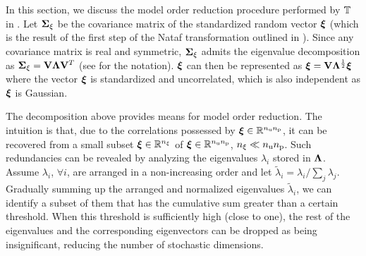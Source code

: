 In this section, we discuss the model order reduction procedure performed by $\transformation$ in .
Let $\bm{\Sigma}_\xi$ be the covariance matrix of the standardized random vector $\bm{\xi}$ (which is the result of the first step of the Nataf transformation outlined in ).
Since any covariance matrix is real and symmetric, $\bm{\Sigma}_\xi$ admits the eigenvalue decomposition as $\bm{\Sigma}_\xi = \mathbf{V} \mathbf{\Lambda} \mathbf{V}^T$ (see  for the notation).
$\bm{\xi}$ can then be represented as $\bm{\xi} = \mathbf{V} \mathbf{\Lambda}^\frac{1}{2} \bm{\xi}$ where the vector $\bm{\xi}$ is standardized and uncorrelated, which is also independent as $\bm{\xi}$ is Gaussian.

The decomposition above provides means for model order reduction.
The intuition is that, due to the correlations possessed by $\bm{\xi} \in \mathbb{R}^{{n_\text{u}} {n_\text{p}}}$, it can be recovered from a small subset $\bm{\xi} \in \mathbb{R}^{n_\xi}$ of $\bm{\xi}\in \mathbb{R}^{{n_\text{u}} {n_\text{p}}}$, ${n_\xi} \ll {n_\text{u}} {n_\text{p}}$.
Such redundancies can be revealed by analyzing the eigenvalues $\lambda_i$ stored in $\mathbf{\Lambda}$.
Assume $\lambda_i$, $\forall i$, are arranged in a non-increasing order and let $\tilde{\lambda}_i = \lambda_i / \sum_j \lambda_j$.
Gradually summing up the arranged and normalized eigenvalues $\tilde{\lambda}_i$, we can identify a subset of them that has the cumulative sum greater than a certain threshold.
When this threshold is sufficiently high (close to one), the rest of the eigenvalues and the corresponding eigenvectors can be dropped as being insignificant, reducing the number of stochastic dimensions.

